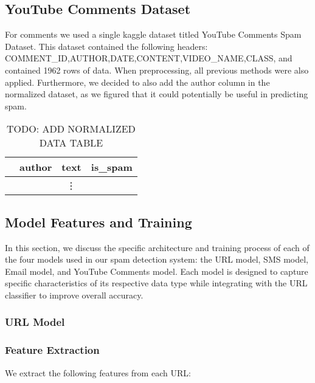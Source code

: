 \documentclass{article}
\begin{document}
\subsection*{YouTube Comments Dataset}
For comments we used a single kaggle dataset titled YouTube Comments Spam Dataset. This dataset contained the following headers: COMMENT\_ID,AUTHOR,DATE,CONTENT,VIDEO\_NAME,CLASS, and contained 1962 rows of data.
\newline
\newline
\noindent
When preprocessing, all previous methods were also applied. Furthermore, we decided to also add the author column in the normalized dataset, as we figured that it could potentially be useful in predicting spam.

\begin{table}[htbp]
    \centering
    \caption{TODO: ADD NORMALIZED DATA TABLE}
    \begin{tabular}{llll}
    \toprule
     & author & text & is\_spam \\
    \midrule
    \multicolumn{4}{c}{\vdots} \\ %
    \bottomrule
    \end{tabular}
    \label{tab:csv_sample}
\end{table}

\subsection{Model Features and Training}

In this section, we discuss the specific architecture and training process of each of the four models used in our spam detection system: the URL model, SMS model, Email model, and YouTube Comments model. Each model is designed to capture specific characteristics of its respective data type while integrating with the URL classifier to improve overall accuracy.

\subsubsection{URL Model}

\subsubsection*{Feature Extraction}

We extract the following features from each URL:
\end{document}

